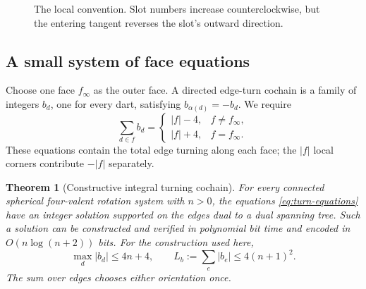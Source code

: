 \documentclass[11pt]{article}
\newtheorem{theorem}{Theorem}[section]
\theoremstyle{definition}
\theoremstyle{remark}
\begin{document}
\begin{figure}[ht]
\centering
{}
\caption{The local convention. Slot numbers increase counterclockwise,
but the entering tangent reverses the slot's outward direction.}
\label{fig:turn-convention}
\end{figure}

\subsection{A small system of face equations}

Choose one face $f_\infty$ as the outer face. A directed edge-turn cochain
is a family of integers $b_d$, one for every dart, satisfying
$b_{\alpha(d)}=-b_d$. We require
\begin{equation}\label{eq:turn-equations}
 \sum_{d\in f} b_d=
 \begin{cases}
 |f|-4,&f\ne f_\infty,\\
 |f|+4,&f=f_\infty.
 \end{cases}
\end{equation}
These equations contain the total edge turning along each face; the
$|f|$ local corners contribute $-|f|$ separately.

\begin{theorem}[Constructive integral turning cochain]
\label{thm:turn-construction}
For every connected spherical four-valent rotation system with $n>0$, the
equations \eqref{eq:turn-equations} have an integer solution supported on
the edges dual to a dual spanning tree. Such a solution can be constructed
and verified in polynomial bit time and encoded in $O(n\log(n+2))$ bits.
For the construction used here,
\begin{equation}\label{eq:cochain-bounds}
 \max_d |b_d|\le4n+4,
 \qquad
 L_b:=\sum_{e}|b_e|\le4(n+1)^2.
\end{equation}
The sum over edges chooses either orientation once.
\end{theorem}
\end{document}
